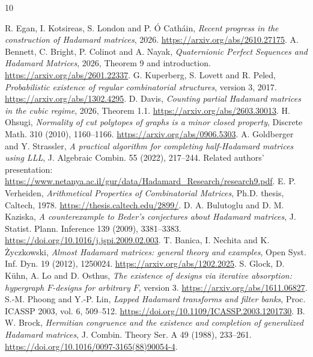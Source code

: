 \documentclass[11pt]{article}
\begin{document}
\begin{thebibliography}{10}
\small\raggedright
{} R. Egan, I. Kotsireas, S. London and P. \'O Cath\'ain,
\emph{Recent progress in the construction of Hadamard matrices}, 2026.
\url{https://arxiv.org/abs/2610.27175}.
 A. Bennett, C. Bright, P. Colinot and A. Nayak,
\emph{Quaternionic Perfect Sequences and Hadamard Matrices}, 2026,
Theorem 9 and introduction. \url{https://arxiv.org/abs/2601.22337}.
 G. Kuperberg, S. Lovett and R. Peled,
\emph{Probabilistic existence of regular combinatorial structures},
version 3, 2017. \url{https://arxiv.org/abs/1302.4295}.
 D. Davis, \emph{Counting partial Hadamard matrices in the
cubic regime}, 2026, Theorem 1.1. \url{https://arxiv.org/abs/2603.30013}.
 H. Ohsugi, \emph{Normality of cut polytopes of graphs
is a minor closed property}, Discrete Math. 310 (2010), 1160--1166.
\url{https://arxiv.org/abs/0906.5303}.
 A. Goldberger and Y. Strassler, \emph{A practical algorithm
for completing half-Hadamard matrices using LLL}, J. Algebraic Combin.
55 (2022), 217--244. Related authors' presentation:
\url{https://www.netanya.ac.il/gur/data/Hadamard_Research/research9.pdf}.
 E. P. Verheiden, \emph{Arithmetical Properties of
Combinatorial Matrices}, Ph.D. thesis, Caltech, 1978.
\url{https://thesis.caltech.edu/2899/}.
 D. A. Bulutoglu and D. M. Kaziska, \emph{A counterexample
to Beder's conjectures about Hadamard matrices}, J. Statist. Plann.
Inference 139 (2009), 3381--3383.
\url{https://doi.org/10.1016/j.jspi.2009.02.003}.
 T. Banica, I. Nechita and K. \.Zyczkowski,
\emph{Almost Hadamard matrices: general theory and examples},
Open Syst. Inf. Dyn. 19 (2012), 1250024.
\url{https://arxiv.org/abs/1202.2025}.
 S. Glock, D. K\"uhn, A. Lo and D. Osthus,
\emph{The existence of designs via iterative absorption: hypergraph
$F$-designs for arbitrary $F$}, version 3.
\url{https://arxiv.org/abs/1611.06827}.
 S.-M. Phoong and Y.-P. Lin,
\emph{Lapped Hadamard transforms and filter banks},
Proc. ICASSP 2003, vol. 6, 509--512.
\url{https://doi.org/10.1109/ICASSP.2003.1201730}.
 B. W. Brock, \emph{Hermitian congruence and the existence
and completion of generalized Hadamard matrices}, J. Combin. Theory
Ser. A 49 (1988), 233--261.
\url{https://doi.org/10.1016/0097-3165(88)90054-4}.
\end{thebibliography}
\end{document}
